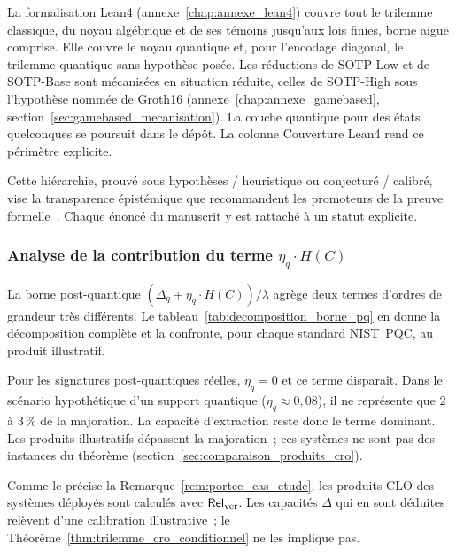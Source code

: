 \begin{sloppypar}
\begin{remark}
\label{rem:perimetre_lean4}
La formalisation Lean4 (annexe~\ref{chap:annexe_lean4}) couvre tout le trilemme classique,
du noyau alg\'ebrique et de ses t\'emoins jusqu'aux lois finies, borne aigu\"e comprise. Elle
couvre le noyau quantique et, pour l'encodage diagonal, le trilemme quantique sans hypoth\`ese
pos\'ee. Les r\'eductions de SOTP-Low et de SOTP-Base sont m\'ecanis\'ees en situation r\'eduite,
celles de SOTP-High sous l'hypoth\`ese nomm\'ee de Groth16 (annexe~\ref{chap:annexe_gamebased},
section~\ref{sec:gamebased_mecanisation}). La couche quantique pour des \'etats quelconques se
poursuit dans le d\'ep\^ot. La colonne
\og Couverture Lean4 \fg{} rend ce p\'erim\`etre explicite.
\end{remark}

Cette hi\'erarchie, prouv\'e sous hypoth\`eses / heuristique ou conjectur\'e /
calibr\'e, vise la transparence \'epist\'emique que recommandent les
promoteurs de la preuve formelle~\cite{Wiedijk2008,Avigad2014}. Chaque
\'enonc\'e du manuscrit y est rattach\'e \`a un statut explicite.

\subsubsection{Analyse de la contribution du terme $\eta_q \cdot H(C)$}
\label{subsubsec:analyse_contribution_eta_q}

La borne post-quantique $(\Delta_q + \eta_q \cdot H(C))/\lambda$ agr\`ege
deux termes d'ordres de grandeur tr\`es diff\'erents. Le
tableau~\ref{tab:decomposition_borne_pq} en donne la d\'ecomposition
compl\`ete et la confronte, pour chaque standard NIST~PQC, au produit
illustratif.

Pour les signatures post-quantiques r\'eelles, $\eta_q = 0$ et ce terme
dispara\^it. Dans le sc\'enario hypoth\'etique d'un support quantique
($\eta_q \approx 0{,}08$), il ne repr\'esente que $2$ \`a $3\,\%$ de la
majoration. La capacit\'e d'extraction reste donc le terme dominant. Les produits
illustratifs d\'epassent la majoration~; ces syst\`emes ne sont pas des
instances du th\'eor\`eme (section~\ref{sec:comparaison_produits_cro}).

\begin{remark}
\label{rem:clarification_section_VI_B}
Comme le pr\'ecise la Remarque~\ref{rem:portee_cas_etude}, les produits CLO des syst\`emes
d\'eploy\'es sont calcul\'es avec $\mathsf{Rel}_{\mathrm{ver}}$. Les capacit\'es $\Delta$ qui en sont
d\'eduites rel\`event d'une calibration illustrative~; le
Th\'eor\`eme~\ref{thm:trilemme_cro_conditionnel} ne les implique pas.
\end{remark}
\end{sloppypar}

